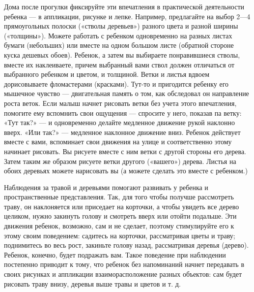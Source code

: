\documentclass[a5paper]{book}
\begin{document}
Дома после прогулки фиксируйте эти впечатления в практической
деятельности ребенка --- в аппликации, рисунке и лепке. Например,
предлагайте на выбор 2---4 прямоугольных полоски («стволы деревьев»)
разного цвета и разной ширины («толщины»). Можете работать с ребенком
одновременно на разных листах бумаги (небольших) или вместе на одном
большом листе (обратной стороне куска дешевых обоев). Ребенок, а затем
вы выбираете понравившиеся стволы, вместе их наклеиваете, причем
выбранный вами ствол должен отличаться от выбранного ребенком и цветом,
и толщиной. Ветки и листья вдвоем дорисовываете фломастерами (красками).
Тут-то и пригодится ребенку его мышечное чувство --- двигательная память
о том, как обследовал он направление роста веток. Если малыш начнет
рисовать ветки без учета этого впечатления, помогите ему вспомнить свои
ощущения --- спросите у него, показав па ветку: «Тут так?» --- и
одновременно делайте медленное движение рукой наклонно вверх. «Или так?»
--- медленное наклонное движение вниз. Ребенок действует вместе с вами,
вспоминает свои движения на улице и соответственно этому начинает
рисовать. Вы рисуете вместе с ним ветки с другой стороны его дерева.
Затем таким же образом рисуете ветки другого («вашего») дерева. Листья
на обоих деревьях можете нарисовать вы (а можете сделать это вместе с
ребенком.)

Наблюдения за травой и деревьями помогают развивать у ребенка и
пространственные представления. Так, для того чтобы получше рассмотреть
траву, он наклоняется или приседает на корточки, а чтобы увидеть все
дерево целиком, нужно закинуть голову и смотреть вверх или отойти
подальше. Эти движения ребенок, возможно, сам и не сделает, поэтому
стимулируйте его к этому своим поведением: садитесь на корточки,
рассматривая цветы и траву; поднимитесь во весь рост, закиньте голову
назад, рассматривая деревья (дерево). Ребенок, конечно, будет подражать
вам. Такое поведение при наблюдении постепенно приводит к тому, что
ребенок без напоминаний начнет передавать в своих рисунках и аппликации
взаиморасположение разных объектов: сам будет рисовать траву внизу,
деревья выше травы и цветов и т. д.
\end{document}
